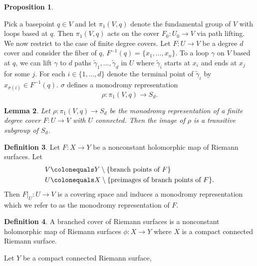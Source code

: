 \documentclass{dcthesis}
\newcommand{\defi}[1]{\textsf{#1}}
\newcommand{\wt}[1]{\widetilde{#1}}
\newcommand{\sm}{\setminus}
\newtheorem{prop}{Proposition}[section]
\newtheorem{lemma}[prop]{Lemma}
\theoremstyle{definition}
\newtheorem{definition}[prop]{Definition}
\theoremstyle{remark}
\numberwithin{equation}{section}
\numberwithin{figure}{section}
\begin{document}
{{\begin{prop}
    \end{prop}
    Pick a basepoint $q\in V$
    and let $\pi_1(V,q)$ denote
    the \defi{fundamental group} of $V$
    with loops based at $q$.
    Then $\pi_1(V,q)$ acts on the cover
    $F_0\colon U_0\to V$
    via path lifting.
    We now restrict to the case of finite degree covers.
    Let $F\colon U\to V$ be a degree $d$ cover
    and consider the fiber of $q$,
    $F^{-1}(q) = \{x_1,\dots,x_n\}$.
    To a loop $\gamma$ on $V$ based at $q$,
    we can lift $\gamma$ to $d$ paths
    $\wt{\gamma}_1,\dots,\wt{\gamma}_d$
    in $U$ where $\wt{\gamma}_i$
    starts at $x_i$
    and ends at $x_j$ for some $j$.
    For each $i\in \{1,\ldots,d\}$ denote the terminal
    point of $\wt{\gamma}_i$ by $x_{\sigma(i)}\in F^{-1}(q)$.
    $\sigma$ defines
    a \defi{monodromy representation}
    \begin{equation}
      \label{eqn:monodromyrep}
      \rho\colon
      \pi_1(V,q)\to S_d.
    \end{equation}
    \begin{lemma}
      \label{lem:transitive}
      Let $\rho\colon\pi_1(V,q)\to S_d$
      be the monodromy representation
      of a
      finite degree cover $F\colon U\to V$
      with $U$ connected.
      Then the image of $\rho$
      is a transitive subgroup of $S_d$.
    \end{lemma}
    \begin{definition}
      \label{def:monodromyrepofholomorphicmap}
      Let $F\colon X\to Y$ be a nonconstant holomorphic
      map of Riemann surfaces.
      Let
      \begin{align*}
        V &\colonequals Y\sm \{\text{branch points of $F$}\}\\
        U &\colonequals X\sm \{\text{preimages of branch points of $F$}\}.
      \end{align*}
      Then $F|_U\colon U\to V$ is a covering space
      and induces a monodromy representation
      which we refer to as the
      \defi{monodromy representation of $F$}.
    \end{definition}
    \begin{definition}
      \label{def:branchedcoverofriemannsurface}
      A \defi{branched cover of Riemann surfaces} is a nonconstant holomorphic map
      of Riemann surfaces
      $\phi\colon X\to Y$ where $X$ is a compact connected Riemann surface.
    \end{definition}
    Let $Y$ be a compact connected Riemann surface,
}}
\end{document}
